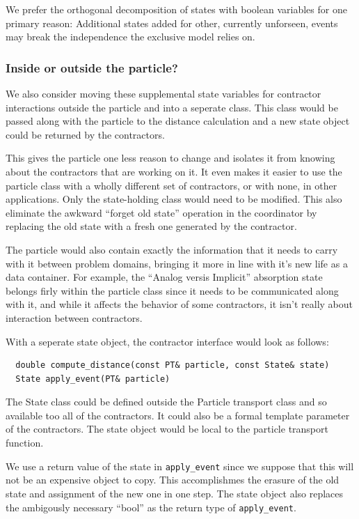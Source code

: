 \documentclass[memo]{ResearchNote}
\begin{document}
We prefer the orthogonal decomposition of states with boolean
variables for one primary reason: Additional states added for other,
currently unforseen, events may break the independence the exclusive
model relies on.

\subsubsection{Inside or outside the particle?}

We also consider moving these supplemental state variables for
contractor interactions outside the particle and into a seperate
class. This class would be passed along with the particle to the
distance calculation and a new state object could be returned by the
contractors.

This gives the particle one less reason to change and isolates it from
knowing about the contractors that are working on it. It even makes it
easier to use the particle class with a wholly different set of
contractors, or with none, in other applications. Only the
state-holding class would need to be modified.  This also eliminate
the awkward ``forget old state'' operation in the coordinator by
replacing the old state with a fresh one generated by the contractor.

The particle would also contain exactly the information that it needs
to carry with it between problem domains, bringing it more in line
with it's new life as a data container. For example, the ``Analog
versis Implicit'' absorption state belongs firly within the particle
class since it needs to be communicated along with it, and while it
affects the behavior of some contractors, it isn't really about
interaction between contractors.

With a seperate state object, the contractor interface would look as
follows:

\begin{verbatim}
  double compute_distance(const PT& particle, const State& state)
  State apply_event(PT& particle)
\end{verbatim}

The State class could be defined outside the Particle transport class
and so available too all of the contractors. It could also be a formal
template parameter of the contractors.  The state object would be
local to the particle transport function. 

We use a return value of the state in {\tt apply\_event} since we
suppose that this will not be an expensive object to copy. This
accomplishmes the erasure of the old state and assignment of the new
one in one step. The state object also replaces the ambigously
necessary ``bool'' as the return type of {\tt apply\_event}.
\end{document}
